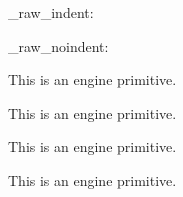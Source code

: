 \begin{function}[]
  {
    \para_raw_indent:
  }
  \begin{syntax}
  \end{syntax}

\end{function}



\begin{function}[]
  {
    \para_raw_noindent:
  }
  \begin{syntax}
  \end{syntax}

\end{function}






\begin{function}[]
  {
    \parfillskip
  }
  \begin{syntax}
  \end{syntax}
  This is an engine primitive.
\end{function}



\begin{function}[]
  {
    \parindent
  }
  \begin{syntax}
  \end{syntax}
  This is an engine primitive.
\end{function}



\begin{function}[]
  {
    \parshape
  }
  \begin{syntax}
  \end{syntax}
  This is an engine primitive.
\end{function}



\begin{function}[]
  {
    \parskip
  }
  \begin{syntax}
  \end{syntax}
  This is an engine primitive.
\end{function}




